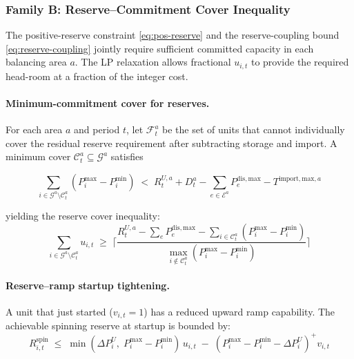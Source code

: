 \subsubsection{Family B: Reserve--Commitment Cover Inequality}
\label{sec:cut-B}

The positive-reserve constraint \eqref{eq:pos-reserve} and the
reserve-coupling bound \eqref{eq:reserve-coupling} jointly require
sufficient committed capacity in each balancing area $a$.  The LP
relaxation allows fractional $u_{i,t}$ to provide the required head-room
at a fraction of the integer cost.

\paragraph{Minimum-commitment cover for reserves.}
For each area $a$ and period $t$, let $\mathcal{F}^a_t$ be the set of
units that cannot individually cover the residual reserve requirement
after subtracting storage and import.  A minimum cover
$\mathcal{C}^a_t \subseteq \mathcal{G}^a$ satisfies

\begin{equation}\label{eq:cut-B-cover-def}
  \sum_{i \in \mathcal{G}^a \setminus \mathcal{C}^a_t}
    (P^{\max}_i - P^{\min}_i)
  \;<\; R^{U,a}_t + D^a_t
    - \sum_{e \in \mathcal{E}^a} P^{\mathrm{dis,max}}_e
    - T^{\mathrm{import,max},a}
\end{equation}

yielding the reserve cover inequality:
\begin{equation}\label{eq:cut-B-cover}
  \boxed{
    \sum_{i \in \mathcal{G}^a \setminus \mathcal{C}^a_t} u_{i,t}
    \;\geq\;
    \biggl\lceil
      \frac{R^{U,a}_t - \sum_{e}P^{\mathrm{dis,max}}_e
            - \sum_{i \in \mathcal{C}^a_t}(P^{\max}_i-P^{\min}_i)}
           {\max_{i \notin \mathcal{C}^a_t}(P^{\max}_i - P^{\min}_i)}
    \biggr\rceil
  }
\end{equation}

\paragraph{Reserve--ramp startup tightening.}
A unit that just started ($v_{i,t}=1$) has a reduced upward ramp
capability.  The achievable spinning reserve at startup is bounded by:
\begin{equation}\label{eq:cut-B-ramp}
  \boxed{
    R^{\mathrm{spin}}_{i,t}
    \;\leq\;
    \min(\Delta P^U_i,\; P^{\max}_i - P^{\min}_i)\,u_{i,t}
    \;-\; (P^{\max}_i - P^{\min}_i - \Delta P^U_i)^{\!+} v_{i,t}
  }
\end{equation}

